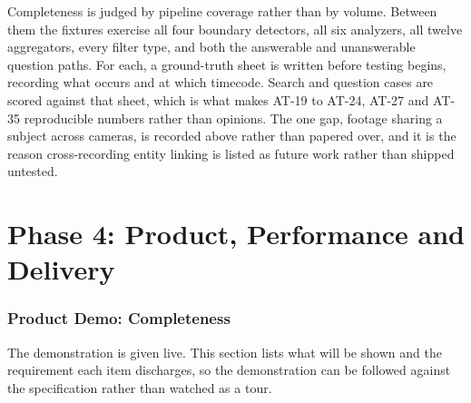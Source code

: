 \documentclass[11pt,a4paper]{article}
\begin{document}
Completeness is judged by pipeline coverage rather than by volume. Between them
the fixtures exercise all four boundary detectors, all six analyzers, all twelve
aggregators, every filter type, and both the answerable and unanswerable
question paths. For each, a ground-truth sheet is written before testing begins,
recording what occurs and at which timecode. Search and question cases are
scored against that sheet, which is what makes AT-19 to AT-24, AT-27 and AT-35
reproducible numbers rather than opinions. The one gap, footage sharing a
subject across cameras, is recorded above rather than papered over, and it is
the reason cross-recording entity linking is listed as future work rather than
shipped untested.

\part{Phase 4: Product, Performance and Delivery}

\section{Product Demo: Completeness}

The demonstration is given live. This section lists what will be shown and the
requirement each item discharges, so the demonstration can be followed against
the specification rather than watched as a tour.
\end{document}
